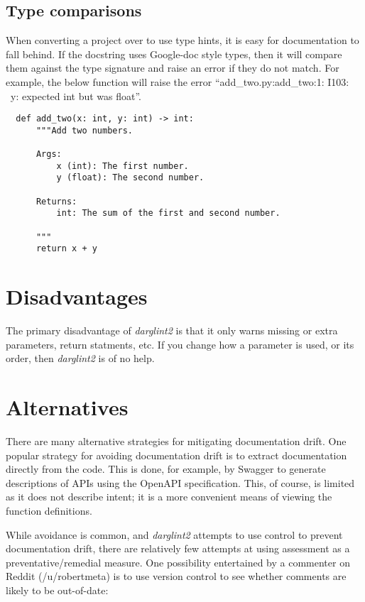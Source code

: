 \documentclass[landscape]{sciposter}
\begin{document}
\begin{multicols}{4}
        \subsection{Type comparisons}
            When converting a project over to use type hints, it is easy
            for documentation to fall behind.  If the docstring uses Google-doc
            style types, then it will compare them against the type signature
            and raise an error if they do not match. For example, the below
            function will raise the error ``add\_two.py:add\_two:1: I103: ~y:
            expected int but was float''.

\begin{verbatim}
  def add_two(x: int, y: int) -> int:
      """Add two numbers.

      Args:
          x (int): The first number.
          y (float): The second number.

      Returns:
          int: The sum of the first and second number.

      """
      return x + y
\end{verbatim}

    \section{Disadvantages}
        The primary disadvantage of \textit{darglint2} is that it only warns
        missing or extra parameters, return statments, etc.  If you change how
        a parameter is used, or its order, then \textit{darglint2} is of no help.

    \section{Alternatives}
        There are many alternative strategies for mitigating documentation
        drift.  One popular strategy for avoiding documentation drift is
        to extract documentation directly from the code.  This is done,
        for example, by Swagger to generate descriptions of APIs using
        the OpenAPI specification.  This, of course, is limited as it does
        not describe intent; it is a more convenient means of viewing the
        function definitions.

        While avoidance is common, and \textit{darglint2} attempts to use control
        to prevent documentation drift, there are relatively few attempts
        at using assessment as a preventative/remedial measure.  One possibility
        entertained by a commenter on Reddit (/u/robertmeta) is to use
        version control to see whether comments are likely to be out-of-date:


\end{multicols}
\end{document}
